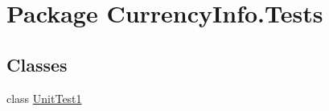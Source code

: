 \hypertarget{namespace_currency_info_1_1_tests}{\section{Package Currency\-Info.\-Tests}
\label{namespace_currency_info_1_1_tests}
}
\subsection*{Classes}
\begin{DoxyCompactItemize}
\item 
class \hyperlink{class_currency_info_1_1_tests_1_1_unit_test1}{Unit\-Test1}
\end{DoxyCompactItemize}
